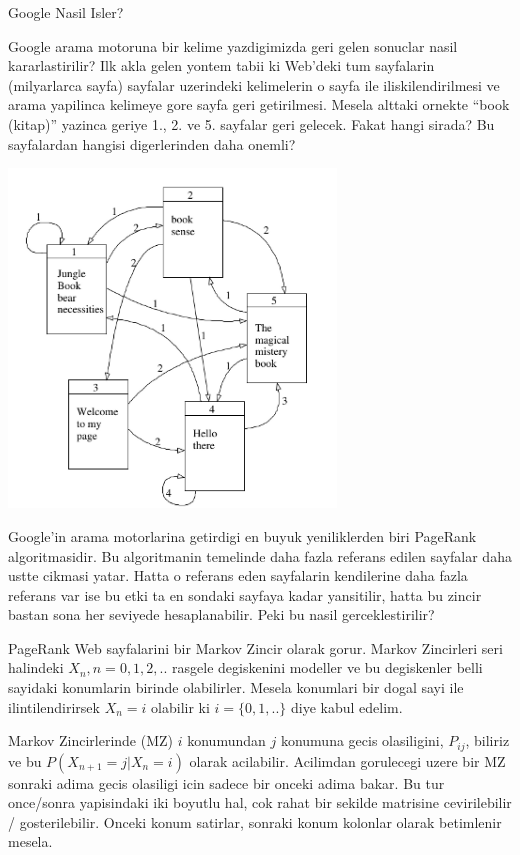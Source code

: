 \documentclass[12pt,fleqn]{article}\usepackage{../common}
\begin{document}
Google Nasil Isler? 

Google arama motoruna bir kelime yazdigimizda geri gelen sonuclar nasil
kararlastirilir? Ilk akla gelen yontem tabii ki Web'deki tum sayfalarin
(milyarlarca sayfa) sayfalar uzerindeki kelimelerin o sayfa ile
iliskilendirilmesi ve arama yapilinca kelimeye gore sayfa geri
getirilmesi. Mesela alttaki ornekte ``book (kitap)'' yazinca geriye 1.,
2. ve 5. sayfalar geri gelecek. Fakat hangi sirada? Bu sayfalardan hangisi
digerlerinden daha onemli?

\includegraphics[height=9cm]{pg2.png}

Google'in arama motorlarina getirdigi en buyuk yeniliklerden biri PageRank
algoritmasidir. Bu algoritmanin temelinde daha fazla referans edilen
sayfalar daha ustte cikmasi yatar. Hatta o referans eden sayfalarin
kendilerine daha fazla referans var ise bu etki ta en sondaki sayfaya kadar
yansitilir, hatta bu zincir bastan sona her seviyede hesaplanabilir. Peki bu
nasil gerceklestirilir?

PageRank Web sayfalarini bir Markov Zincir olarak gorur. Markov Zincirleri
seri halindeki $X_n, n=0,1,2,..$ rasgele degiskenini modeller ve bu
degiskenler belli sayidaki konumlarin birinde olabilirler. Mesela konumlari
bir dogal sayi ile ilintilendirirsek $X_n = i$ olabilir ki $i=\{0,1,..\}$
diye kabul edelim. 

Markov Zincirlerinde (MZ) $i$ konumundan $j$ konumuna gecis olasiligini,
$P_{ij}$, biliriz ve bu $P(X_{n+1} = j | X_{n} = i)$ olarak acilabilir. Acilimdan  
gorulecegi uzere bir MZ sonraki adima gecis olasiligi icin sadece
bir onceki adima bakar. Bu tur once/sonra yapisindaki iki boyutlu hal, 
cok rahat bir sekilde matrisine cevirilebilir / gosterilebilir. Onceki konum 
satirlar, sonraki konum kolonlar olarak betimlenir mesela. 
\end{document}
